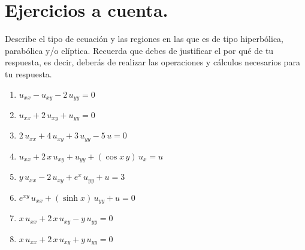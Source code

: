 \newpage

\section{Ejercicios a cuenta.}

Describe el tipo de ecuación y las regiones en las que es de tipo hiperbólica, parabólica y/o elíptica. Recuerda que debes de justificar el por qué de tu respuesta, es decir, deberás de realizar las operaciones y cálculos necesarios para tu respuesta.

\begin{enumerate}[label=\alph*)]
\item \Large{$u_{xx} - u_{xy} - 2 \, u_{yy} = 0$}
\item \Large{$u_{xx} + 2 \, u_{xy} + u_{yy} = 0$}
\item \Large{$2 \, u_{xx} + 4 \, u_{xy} + 3 \, u_{yy} - 5 \, u = 0$}
\item \Large{$u_{xx} + 2 \, x \, u_{xy} + u_{yy} + (\cos x \, y) \, u_{x} = u$}
\item \Large{$y \, u_{xx} - 2 \, u_{xy} + e^{x} \, u_{yy} + u = 3$}
\item \Large{$e^{x y} \, u_{xx} + (\sinh x) \, u_{yy} + u = 0$}
\item \Large{$x \, u_{xx} + 2 \, x \, u_{xy} - y \, u_{yy} = 0$}
\item \Large{$x \, u_{xx} + 2 \, x \, u_{xy} + y \, u_{yy} = 0$}
\end{enumerate}

